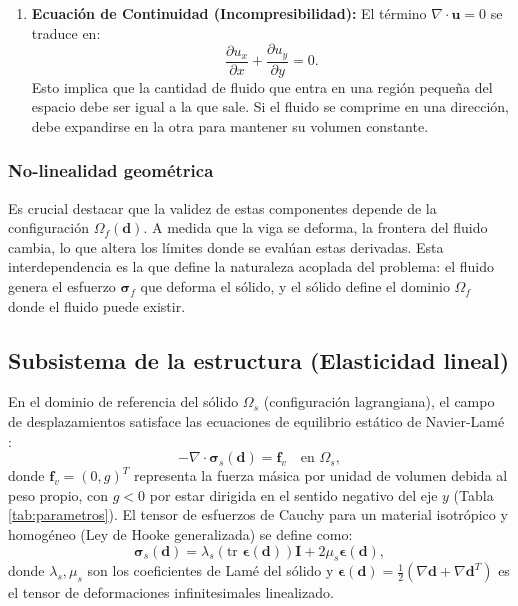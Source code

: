 \documentclass[12pt, letterpaper]{report}
\theoremstyle{definition}
\begin{document}
\begin{enumerate}
    \item \textbf{Ecuación de Continuidad (Incompresibilidad):} El término $\nabla \cdot \mathbf{u} = 0$ se traduce en:
    \begin{equation}
        \frac{\partial u_x}{\partial x} + \frac{\partial u_y}{\partial y} = 0.
    \end{equation}
    Esto implica que la cantidad de fluido que entra en una región pequeña del espacio debe ser igual a la que sale. Si el fluido se comprime en una dirección, debe expandirse en la otra para mantener su volumen constante.
\end{enumerate}

\subsubsection{No-linealidad geométrica}

Es crucial destacar que la validez de estas componentes depende de la configuración $\Omega_f(\mathbf{d})$. A medida que la viga se deforma, la frontera del fluido cambia, lo que altera los límites donde se evalúan estas derivadas. Esta interdependencia es la que define la naturaleza acoplada del problema: el fluido genera el esfuerzo $\boldsymbol{\sigma}_f$ que deforma el sólido, y el sólido define el dominio $\Omega_f$ donde el fluido puede existir.

\subsection{Subsistema de la estructura (Elasticidad lineal)}
\label{subsec:solido}

En el dominio de referencia del sólido $\Omega_s$ (configuración lagrangiana), el campo de desplazamientos satisface las ecuaciones de equilibrio estático de Navier-Lamé \cite{ciarlet1988mathematical}:
\begin{equation} \label{eq:strong_solid}
    -\nabla \cdot \boldsymbol{\sigma}_s(\mathbf{d}) = \mathbf{f}_v \quad \text{en } \Omega_s,
\end{equation}
donde $\mathbf{f}_v = (0, g)^T$ representa la fuerza másica por unidad de volumen debida al peso propio, con $g < 0$ por estar dirigida en el sentido negativo del eje $y$ (Tabla \ref{tab:parametros}). El tensor de esfuerzos de Cauchy para un material isotrópico y homogéneo (Ley de Hooke generalizada) se define como:
\[
\boldsymbol{\sigma}_s(\mathbf{d}) = \lambda_s (\text{tr } \boldsymbol{\epsilon}(\mathbf{d})) \mathbf{I} + 2\mu_s \boldsymbol{\epsilon}(\mathbf{d}),
\]
donde $\lambda_s, \mu_s$ son los coeficientes de Lamé del sólido y $\boldsymbol{\epsilon}(\mathbf{d}) = \frac{1}{2}(\nabla \mathbf{d} + \nabla \mathbf{d}^T)$ es el tensor de deformaciones infinitesimales linealizado.
\end{document}
